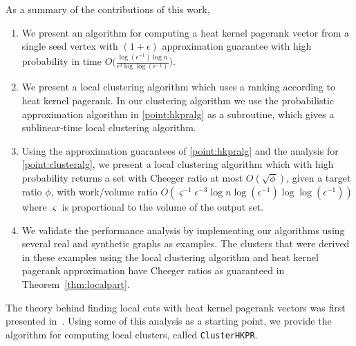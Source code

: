 \documentclass[runningheads,a4paper]{llncs}
\newcommand{\hkprcomplexity}{O\big(\frac{\log(\epsilon^{-1})\log n}{\epsilon^3\log\log(\epsilon^{-1})}\big)}
\newcommand{\partitionalg}{\texttt{ClusterHKPR}}
\begin{document}
As a summary of the contributions of this work,
\begin{enumerate}[label={(\arabic*)}]
\item We present an algorithm for computing a heat kernel pagerank vector from a
single seed vertex with $(1+\epsilon)$ approximation guarantee with high
probability in time $\hkprcomplexity$.\label{point:hkpralg} 
\item We present a local clustering algorithm which uses a ranking according
to heat kernel pagerank.  In our clustering algorithm we use the probabilistic
approximation algorithm in \ref{point:hkpralg} as a subroutine, which gives a
sublinear-time local clustering algorithm.\label{point:clusteralg} 
\item Using the approximation guarantees of \ref{point:hkpralg} and the analysis
for \ref{point:clusteralg}, we present a local clustering algorithm which with
high probability returns a set with Cheeger ratio at most $O(\sqrt{\phi})$,
given a target ratio $\phi$, with work/volume ratio
$O(\varsigma^{-1}\epsilon^{-3}\log n\log(\epsilon^{-1})\log\log(\epsilon^{-1}))$
where $\varsigma$ is proportional to the volume of the output set.
\item We validate the performance analysis by implementing our algorithms using
several real and synthetic graphs as examples.  The clusters that were derived
in these examples using the local clustering algorithm and heat kernel pagerank
approximation have Cheeger ratios as guaranteed in Theorem~\ref{thm:localpart}.
\end{enumerate}

The theory behind finding local cuts with heat kernel pagerank vectors was first
presented in~\cite{chung:hkpr:07,chung:partitionhkpr:im09}.  Using some of this
analysis as a starting point, we provide the algorithm for computing local
clusters, called \partitionalg.
\end{document}
